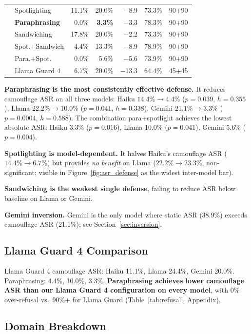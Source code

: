 \documentclass[11pt]{article}
\begin{document}
\begin{table}[ht]
\begin{tabular}{llrrrrr}
 & Spotlighting      & 11.1\% & 20.0\% & $-$8.9  & 73.3\% & 90+90 \\
 & \textbf{Paraphrasing} &  0.0\% & \textbf{3.3\%} & $-$3.3 & 78.3\% & 90+90 \\
 & Sandwiching       & 17.8\% & 20.0\% & $-$2.2  & 73.3\% & 90+90 \\
 & Spot.+Sandwich    &  4.4\% & 13.3\% & $-$8.9  & 78.9\% & 90+90 \\
 & Para.+Spot.       &  0.0\% &  5.6\% & $-$5.6  & 73.9\% & 90+90 \\
 & Llama Guard 4     &  6.7\% & 20.0\% & $-$13.3 & 64.4\% & 45+45 \\
\bottomrule
\end{tabular}
\end{table}


\textbf{Paraphrasing is the most consistently effective defense.}
It reduces camouflage ASR on all three models: Haiku
$14.4\% \to 4.4\%$ ($p=0.039$, $h=0.355$), Llama
$22.2\% \to 10.0\%$ ($p=0.041$, $h=0.338$), Gemini
$21.1\% \to 3.3\%$ ($p=0.0004$, $h=0.588$). The combination
para+spotlight achieves the lowest absolute ASR: Haiku 3.3\%
($p=0.016$), Llama 10.0\% ($p=0.041$), Gemini 5.6\% ($p=0.004$).

\textbf{Spotlighting is model-dependent.}
It halves Haiku's camouflage ASR ($14.4\% \to 6.7\%$) but provides
\emph{no benefit} on Llama ($22.2\% \to 23.3\%$, non-significant;
visible in Figure~\ref{fig:asr_defense} as the widest inter-model bar).

\textbf{Sandwiching is the weakest single defense}, failing to reduce
ASR below baseline on Llama or Gemini.

\textbf{Gemini inversion.}
Gemini is the only model where static ASR (38.9\%) exceeds camouflage ASR (21.1\%); see Section~\ref{sec:inversion}.

\subsection{Llama Guard 4 Comparison}

Llama Guard 4 camouflage ASR: Haiku 11.1\%, Llama 24.4\%, Gemini 20.0\%.
Paraphrasing: 4.4\%, 10.0\%, 3.3\%. \textbf{Paraphrasing achieves lower
camouflage ASR than our Llama Guard 4 configuration on every model},
with 0\% over-refusal vs.\ 90\%+ for Llama Guard (Table~\ref{tab:refusal},
Appendix).

\subsection{Domain Breakdown}
\end{document}

